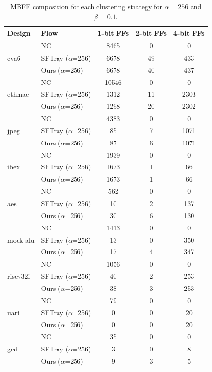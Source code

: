 \begin{table}[t]
\centering
\caption{MBFF composition for each clustering strategy for $\alpha = 256$ and $\beta = 0.1$.}
\label{tab:mbff_alpha_256}
\begin{tabular}{llccc}
\toprule
Design & Flow & 1-bit FFs & 2-bit FFs & 4-bit FFs \\
\midrule
\multirow{3}{*}{cva6} & NC & 8465 & 0 & 0 \\
 & SFTray  ($\alpha$=256) & 6678 & 49 & 433 \\
 & Ours  ($\alpha$=256) & 6678 & 40 & 437 \\
\midrule
\multirow{3}{*}{ethmac} & NC & 10546 & 0 & 0 \\
 & SFTray  ($\alpha$=256) & 1312 & 11 & 2303 \\
 & Ours  ($\alpha$=256) & 1298 & 20 & 2302 \\
\midrule
\multirow{3}{*}{jpeg} & NC & 4383 & 0 & 0 \\
 & SFTray  ($\alpha$=256) & 85 & 7 & 1071 \\
 & Ours  ($\alpha$=256) & 87 & 6 & 1071 \\
\midrule
\multirow{3}{*}{ibex} & NC & 1939 & 0 & 0 \\
 & SFTray  ($\alpha$=256) & 1673 & 1 & 66 \\
 & Ours  ($\alpha$=256) & 1673 & 1 & 66 \\
\midrule
\multirow{3}{*}{aes} & NC & 562 & 0 & 0 \\
 & SFTray  ($\alpha$=256) & 10 & 2 & 137 \\
 & Ours  ($\alpha$=256) & 30 & 6 & 130 \\
\midrule
\multirow{3}{*}{mock-alu} & NC & 1413 & 0 & 0 \\
 & SFTray  ($\alpha$=256) & 13 & 0 & 350 \\
 & Ours  ($\alpha$=256) & 17 & 4 & 347 \\
\midrule
\multirow{3}{*}{riscv32i} & NC & 1056 & 0 & 0 \\
 & SFTray  ($\alpha$=256) & 40 & 2 & 253 \\
 & Ours  ($\alpha$=256) & 38 & 3 & 253 \\
\midrule
\multirow{3}{*}{uart} & NC & 79 & 0 & 0 \\
 & SFTray  ($\alpha$=256) & 0 & 0 & 20 \\
 & Ours  ($\alpha$=256) & 0 & 0 & 20 \\
\midrule
\multirow{3}{*}{gcd} & NC & 35 & 0 & 0 \\
 & SFTray  ($\alpha$=256) & 3 & 0 & 8 \\
 & Ours  ($\alpha$=256) & 9 & 3 & 5 \\
\midrule
\bottomrule
\end{tabular}
\end{table}